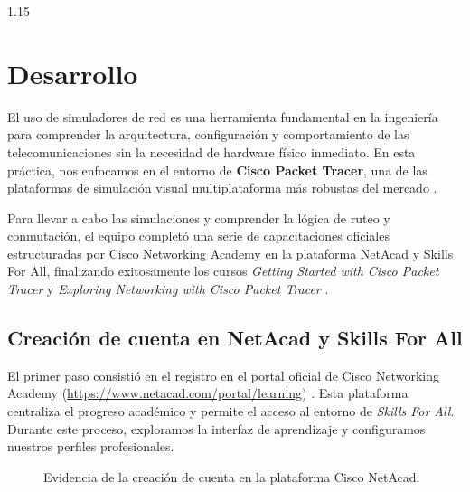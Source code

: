\documentclass[11pt, a4paper]{article}
\begin{document}
\begin{spacing}{1.15}
\newpage

\section{Desarrollo}

El uso de simuladores de red es una herramienta fundamental en la ingeniería para comprender la arquitectura, configuración y comportamiento de las telecomunicaciones sin la necesidad de hardware físico inmediato. En esta práctica, nos enfocamos en el entorno de \textbf{Cisco Packet Tracer}, una de las plataformas de simulación visual multiplataforma más robustas del mercado \cite{pt_docs}.

Para llevar a cabo las simulaciones y comprender la lógica de ruteo y conmutación, el equipo completó una serie de capacitaciones oficiales estructuradas por Cisco Networking Academy en la plataforma NetAcad y Skills For All, finalizando exitosamente los cursos \textit{Getting Started with Cisco Packet Tracer} y \textit{Exploring Networking with Cisco Packet Tracer} \cite{skillsforall, cisco_skills_gettingstarted, cisco_skills_exploring}.

\subsection{Creación de cuenta en NetAcad y Skills For All}
El primer paso consistió en el registro en el portal oficial de Cisco Networking Academy (\url{https://www.netacad.com/portal/learning}) \cite{cisco_netacad}. Esta plataforma centraliza el progreso académico y permite el acceso al entorno de \textit{Skills For All}. Durante este proceso, exploramos la interfaz de aprendizaje y configuramos nuestros perfiles profesionales.

\begin{figure}[H]
    \centering
    \caption{Evidencia de la creación de cuenta en la plataforma Cisco NetAcad.}
    \label{fig:netacad}
\end{figure}


\end{spacing}
\end{document}
